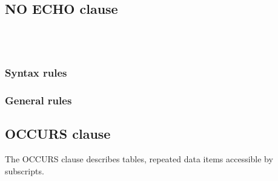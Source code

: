 \subsection{NO ECHO clause}

\begin{syntax}[\miscextcolour]
  \begin{1=}
      \\
     \\
  \end{1=}
\end{syntax}

\subsubsection{Syntax rules}

\subsubsection{General rules}

\subsection{OCCURS clause}

The OCCURS clause describes tables, repeated data items accessible by subscripts.

